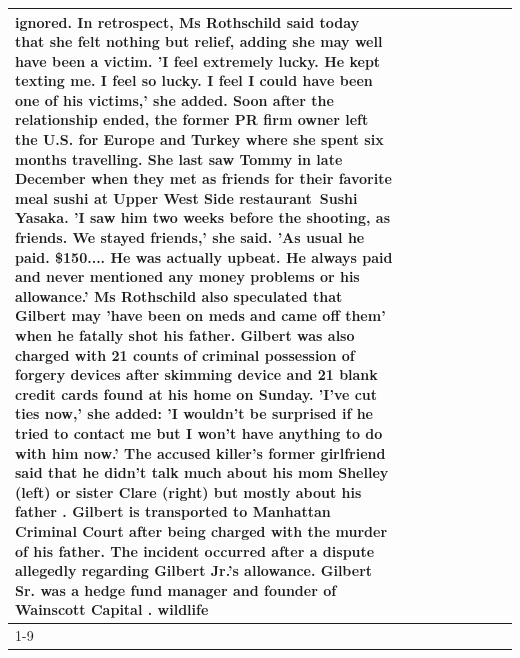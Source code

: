 \begin{table}[H]
\begin{tabular}{lllrlllll}
ignored. In retrospect, Ms Rothschild said today that she felt nothing but relief, adding she may well have been a victim. 'I feel extremely lucky. He kept texting me. I feel so lucky. I feel I could have been one of his victims,' she added. Soon after the relationship ended, the former PR firm owner left the U.S. for Europe and Turkey where she spent six months  travelling. She last saw Tommy in late December when they met as friends for their favorite meal sushi at Upper West Side restaurant Sushi Yasaka. 'I saw him two weeks before the shooting, as friends. We stayed friends,' she said. 'As usual he paid. \$150.... He was actually upbeat. He always paid and never mentioned any money problems or his allowance.' Ms Rothschild also speculated that Gilbert may 'have been on meds and came off them' when he fatally shot his father. Gilbert was also charged with 21 counts of criminal possession of forgery devices after skimming device and 21 blank credit cards found at his home on Sunday. 'I've cut ties now,' she added: 'I wouldn’t be surprised if he tried to contact me but I won’t have anything to do with him now.' The accused killer's former girlfriend said that he didn't talk much about his mom Shelley (left) or sister Clare (right) but mostly about his father . Gilbert is transported to Manhattan Criminal Court  after being charged with the murder of his father. The incident occurred after a dispute allegedly regarding Gilbert Jr.'s allowance. Gilbert Sr. was a hedge fund manager and founder of Wainscott Capital . wildlife \\
\cline{1-9} \cline{2-9}

\end{tabular}
\end{table}
